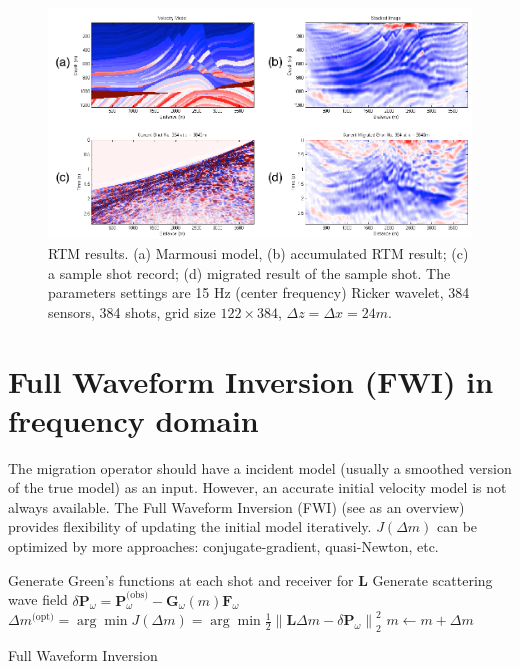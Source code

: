 \documentclass[11pt]{article}
\newcommand{\bx}{\boldsymbol{x}}
\newcommand{\bF}{\boldsymbol{F}}
\newcommand{\bG}{\boldsymbol{G}}
\newcommand{\bL}{\boldsymbol{L}}
\newcommand{\bP}{\boldsymbol{P}}
\theoremstyle{plain}
\theoremstyle{definition}
\theoremstyle{remark}
\numberwithin{equation}{section}
\begin{document}
\begin{figure}
\centering
\includegraphics[width=1\textwidth]{Fig/MarmousiRTM.pdf}
\caption{RTM results. (a) Marmousi model, (b) accumulated RTM result; (c) a sample shot record; (d) migrated result of the sample shot. The parameters settings are 15 Hz (center frequency) Ricker wavelet, 384 sensors, 384 shots, grid size $122 \times 384$, $\Delta z = \Delta x = 24m$.}
\end{figure}





\section{Full Waveform Inversion (FWI) in frequency domain}
The migration operator should have a incident model (usually a smoothed version of the true model) as an input. However, an accurate initial velocity model is not always available. The Full Waveform Inversion (FWI) (see \cite{VirOpe2009} as an overview) provides flexibility of updating the initial model iteratively.  $J(\Delta m)$ can be optimized by more approaches: conjugate-gradient, quasi-Newton, etc.

\begin{algorithm}[H]
\begin{algorithmic}[1]
\WHILE{$m(\bx)$ is not converged}
\STATE Generate Green's functions at each shot and receiver for $\bL$
\STATE Generate scattering wave field $\delta\bP_{\omega}= \bP_{\omega}^{\text{(obs)}} - \bG_{\omega}(m)\bF_{\omega}$
\STATE $\Delta m^{\text{(opt)}} = \arg\min J(\Delta m) = \arg\min \frac{1}{2} \left\| \bL\Delta m - \delta\bP_{\omega}\right\|_2^2$
\STATE $m \leftarrow m + \Delta m$
\ENDWHILE
\end{algorithmic}
\caption{Full Waveform Inversion}
\end{algorithm}




\end{document}
